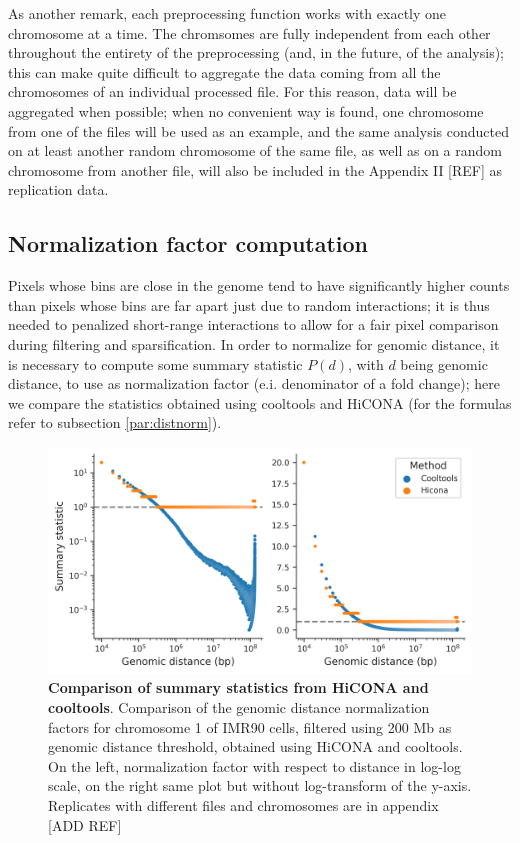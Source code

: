 As another remark, each preprocessing function works with exactly one chromosome at a time. The chromsomes are fully independent from each other throughout the entirety of the preprocessing (and, in the future, of the analysis); this can make quite difficult to aggregate the data coming from all the chromosomes of an individual processed file. For this reason, data will be aggregated when possible; when no convenient way is found, one chromosome from one of the files will be used as an example, and the same analysis conducted on at least another random chromosome of the same file, as well as on a random chromosome from another file, will also be included in the Appendix II [REF] as replication data.

\subsection{Normalization factor computation}

Pixels whose bins are close in the genome tend to have significantly higher counts than pixels whose bins are far apart just due to random interactions; it is thus needed to penalized short-range interactions to allow for a fair pixel comparison during filtering and sparsification. In order to normalize for genomic distance, it is necessary to compute some summary statistic $P(d)$, with $d$ being genomic distance, to use as normalization factor (e.i. denominator of a fold change); here we compare the statistics obtained using cooltools and HiCONA (for the formulas refer to subsection \ref{par:distnorm}). 

\begin{figure}[ht]
  \centering
  \includegraphics[width=1\textwidth]{hicona_vs_cooltools.png}
  \caption{\textbf{Comparison of summary statistics from HiCONA and cooltools}. Comparison of the genomic distance normalization factors for chromosome 1 of IMR90 cells, filtered using 200 Mb as genomic distance threshold, obtained using HiCONA and cooltools. On the left, normalization factor with respect to distance in log-log scale, on the right same plot but without log-transform of the y-axis. Replicates with different files and chromosomes are in appendix [ADD REF]}
  \label{fig:cooltools}
\end{figure}

